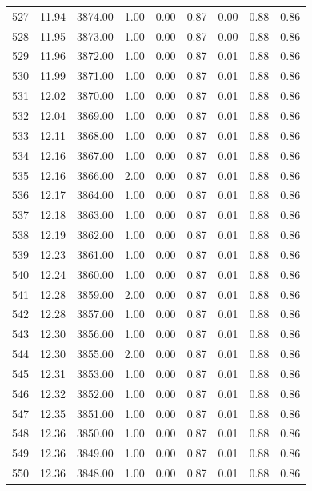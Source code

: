 \documentclass{article}\usepackage[]{graphicx}\usepackage[]{color}
\begin{document}
\begin{longtable}{rrrrrrrrr}
  527 & 11.94 & 3874.00 & 1.00 & 0.00 & 0.87 & 0.00 & 0.88 & 0.86 \\ 
  528 & 11.95 & 3873.00 & 1.00 & 0.00 & 0.87 & 0.00 & 0.88 & 0.86 \\ 
  529 & 11.96 & 3872.00 & 1.00 & 0.00 & 0.87 & 0.01 & 0.88 & 0.86 \\ 
  530 & 11.99 & 3871.00 & 1.00 & 0.00 & 0.87 & 0.01 & 0.88 & 0.86 \\ 
  531 & 12.02 & 3870.00 & 1.00 & 0.00 & 0.87 & 0.01 & 0.88 & 0.86 \\ 
  532 & 12.04 & 3869.00 & 1.00 & 0.00 & 0.87 & 0.01 & 0.88 & 0.86 \\ 
  533 & 12.11 & 3868.00 & 1.00 & 0.00 & 0.87 & 0.01 & 0.88 & 0.86 \\ 
  534 & 12.16 & 3867.00 & 1.00 & 0.00 & 0.87 & 0.01 & 0.88 & 0.86 \\ 
  535 & 12.16 & 3866.00 & 2.00 & 0.00 & 0.87 & 0.01 & 0.88 & 0.86 \\ 
  536 & 12.17 & 3864.00 & 1.00 & 0.00 & 0.87 & 0.01 & 0.88 & 0.86 \\ 
  537 & 12.18 & 3863.00 & 1.00 & 0.00 & 0.87 & 0.01 & 0.88 & 0.86 \\ 
  538 & 12.19 & 3862.00 & 1.00 & 0.00 & 0.87 & 0.01 & 0.88 & 0.86 \\ 
  539 & 12.23 & 3861.00 & 1.00 & 0.00 & 0.87 & 0.01 & 0.88 & 0.86 \\ 
  540 & 12.24 & 3860.00 & 1.00 & 0.00 & 0.87 & 0.01 & 0.88 & 0.86 \\ 
  541 & 12.28 & 3859.00 & 2.00 & 0.00 & 0.87 & 0.01 & 0.88 & 0.86 \\ 
  542 & 12.28 & 3857.00 & 1.00 & 0.00 & 0.87 & 0.01 & 0.88 & 0.86 \\ 
  543 & 12.30 & 3856.00 & 1.00 & 0.00 & 0.87 & 0.01 & 0.88 & 0.86 \\ 
  544 & 12.30 & 3855.00 & 2.00 & 0.00 & 0.87 & 0.01 & 0.88 & 0.86 \\ 
  545 & 12.31 & 3853.00 & 1.00 & 0.00 & 0.87 & 0.01 & 0.88 & 0.86 \\ 
  546 & 12.32 & 3852.00 & 1.00 & 0.00 & 0.87 & 0.01 & 0.88 & 0.86 \\ 
  547 & 12.35 & 3851.00 & 1.00 & 0.00 & 0.87 & 0.01 & 0.88 & 0.86 \\ 
  548 & 12.36 & 3850.00 & 1.00 & 0.00 & 0.87 & 0.01 & 0.88 & 0.86 \\ 
  549 & 12.36 & 3849.00 & 1.00 & 0.00 & 0.87 & 0.01 & 0.88 & 0.86 \\ 
  550 & 12.36 & 3848.00 & 1.00 & 0.00 & 0.87 & 0.01 & 0.88 & 0.86 \\ 

\end{longtable}
\end{document}
